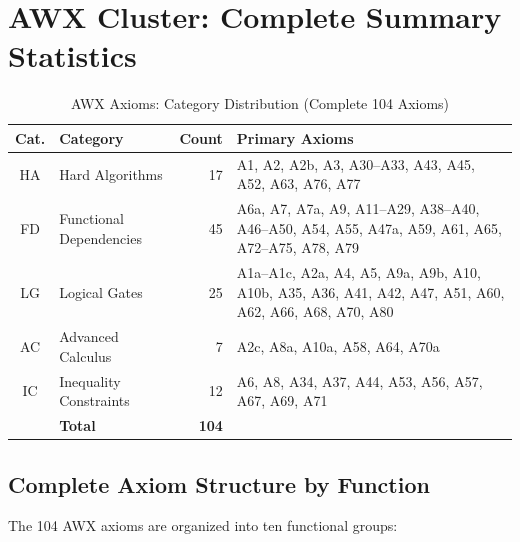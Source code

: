 
\section{AWX Cluster: Complete Summary Statistics}

\begin{table}[htbp]
\centering
\caption{AWX Axioms: Category Distribution (Complete 104 Axioms)}
\label{tab:awx-summary}
\begin{tabular}{clrl}
\toprule
\textbf{Cat.} & \textbf{Category} & \textbf{Count} & \textbf{Primary Axioms} \\
\midrule
HA & Hard Algorithms & 17 & A1, A2, A2b, A3, A30--A33, A43, A45, A52, A63, A76, A77 \\
FD & Functional Dependencies & 45 & A6a, A7, A7a, A9, A11--A29, A38--A40, A46--A50, A54, A55, A47a, A59, A61, A65, A72--A75, A78, A79 \\
LG & Logical Gates & 25 & A1a--A1c, A2a, A4, A5, A9a, A9b, A10, A10b, A35, A36, A41, A42, A47, A51, A60, A62, A66, A68, A70, A80 \\
AC & Advanced Calculus & 7 & A2c, A8a, A10a, A58, A64, A70a \\
IC & Inequality Constraints & 12 & A6, A8, A34, A37, A44, A53, A56, A57, A67, A69, A71 \\
\midrule
& \textbf{Total} & \textbf{104} & \\
\bottomrule
\end{tabular}
\end{table}

\subsection{Complete Axiom Structure by Function}

The 104 AWX axioms are organized into ten functional groups:

